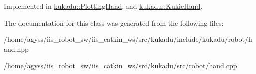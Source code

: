 Implemented in \hyperlink{classkukadu_1_1PlottingHand_a14fc064b6e159b0d7c7a9ce896bfa7d9}{kukadu\+::\+Plotting\+Hand}, and \hyperlink{classkukadu_1_1KukieHand_aac5de8a17e7592b4c0c693fe6d06e0e9}{kukadu\+::\+Kukie\+Hand}.



The documentation for this class was generated from the following files\+:\begin{DoxyCompactItemize}
\item 
/home/agyss/iis\+\_\+robot\+\_\+sw/iis\+\_\+catkin\+\_\+ws/src/kukadu/include/kukadu/robot/hand.\+hpp\item 
/home/agyss/iis\+\_\+robot\+\_\+sw/iis\+\_\+catkin\+\_\+ws/src/kukadu/src/robot/hand.\+cpp\end{DoxyCompactItemize}

